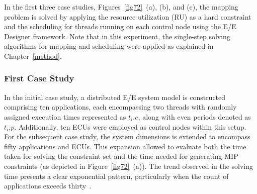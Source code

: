 

    In the first three case studies, Figures~\ref{fig72}~(a), (b), and (c), the mapping problem is solved by applying the resource utilization (RU) as a hard constraint and the scheduling for threads running on each control node using the E/E Designer framework. Note that in this experiment, the single-step solving algorithms for mapping and scheduling were applied as explained in Chapter~\ref{method}. 
    
    \subsubsection{First Case Study}
    In the initial case study, a distributed E/E system model is constructed comprising ten applications, each encompassing two threads with randomly assigned execution times represented as $t_i.e$, along with even periods denoted as $t_i.p$. Additionally, ten ECUs were employed as control nodes within this setup.
    For the subsequent case study, the system dimensions is extended to encompass fifty applications and ECUs. This expansion allowed to evaluate both the time taken for solving the constraint set and the time needed for generating MIP constraints (as depicted in Figure~\ref{fig72}~(a)). The trend observed in the solving time presents a clear exponential pattern, particularly when the count of applications exceeds thirty~\cite{askaripoor2023designer}.

    
